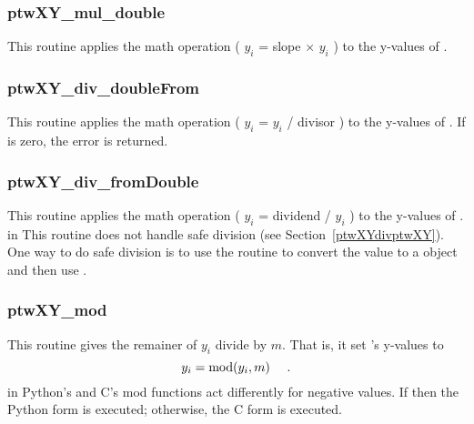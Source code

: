 \subsubsection{ptwXY\_mul\_double}
This routine applies the math operation ( $y_i$ = slope $\times$ $y_i$ ) to the y-values of .

\subsubsection{ptwXY\_div\_doubleFrom}
This routine applies the math operation ( $y_i$ = $y_i$ / divisor ) to the y-values of .
If  is zero, the error  is returned.

\subsubsection{ptwXY\_div\_fromDouble}
This routine applies the math operation ( $y_i$ = dividend / $y_i$ ) to the y-values of .
     in \noindent
This routine does not handle safe division (see Section~\ref{ptwXYdivptwXY}). One way to do safe division is
to use the routine  to convert the  value to a  object and
then use .

\subsubsection{ptwXY\_mod}
This routine gives the remainer of $y_i$ divide by $m$. That is, it set 's y-values to 
\begin{equation}
    y_i = {\rm mod}( y_i, m ) \ \ \ \ .
\end{equation}
     in \noindent
Python's and C's mod functions act differently for negative values. If  then the Python form is executed;
otherwise, the C form is executed.

